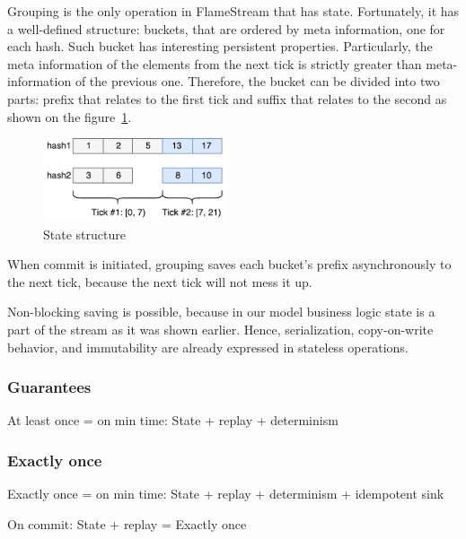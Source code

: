 Grouping is the only operation in FlameStream that has state. Fortunately, it has a well-defined structure: buckets, that are ordered by meta information, one for each hash. Such bucket has interesting persistent properties. Particularly, the meta information of the elements from the next tick is strictly greater than meta-information of the previous one. Therefore, the bucket can be divided into two parts: prefix that relates to the first tick and suffix that relates to the second as shown on the figure~\ref{state-structure}. 

\begin{figure}[htbp]
  \centering
  \includegraphics[width=0.48\textwidth]{pics/state-structure}
  \caption{State structure}
  \label {state-structure}
\end{figure}

When commit is initiated, grouping saves each bucket's prefix asynchronously to the next tick, because the next tick will not mess it up.

Non-blocking saving is possible, because in our model business logic state is a part of the stream as it was shown earlier. Hence, serialization, copy-on-write behavior, and immutability are already expressed in stateless operations.

\subsubsection{Guarantees}
At least once = on min time: State + replay + determinism

\subsubsection{Exactly once}
Exactly once = on min time: State + replay + determinism + idempotent sink

On commit: State + replay = Exactly once

